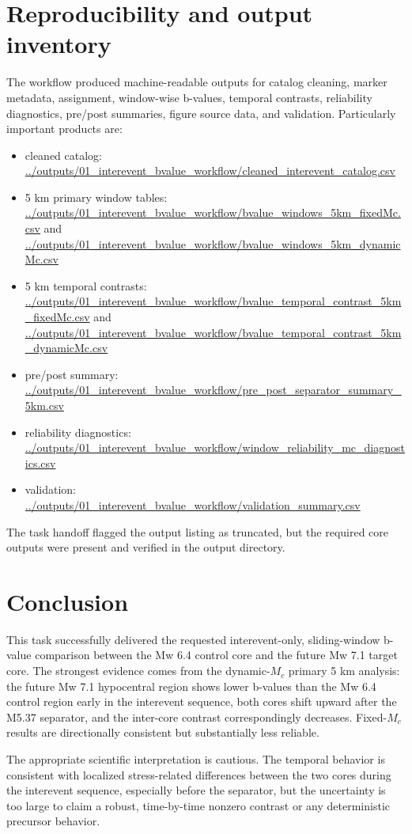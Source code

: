 \documentclass[11pt]{article}
\begin{document}
\section{Reproducibility and output inventory}
The workflow produced machine-readable outputs for catalog cleaning, marker metadata, assignment, window-wise b-values, temporal contrasts, reliability diagnostics, pre/post summaries, figure source data, and validation. Particularly important products are:
\begin{itemize}[leftmargin=1.5em]
    \item cleaned catalog: \url{../outputs/01_interevent_bvalue_workflow/cleaned_interevent_catalog.csv}
    \item 5 km primary window tables: \url{../outputs/01_interevent_bvalue_workflow/bvalue_windows_5km_fixedMc.csv} and \url{../outputs/01_interevent_bvalue_workflow/bvalue_windows_5km_dynamicMc.csv}
    \item 5 km temporal contrasts: \url{../outputs/01_interevent_bvalue_workflow/bvalue_temporal_contrast_5km_fixedMc.csv} and \url{../outputs/01_interevent_bvalue_workflow/bvalue_temporal_contrast_5km_dynamicMc.csv}
    \item pre/post summary: \url{../outputs/01_interevent_bvalue_workflow/pre_post_separator_summary_5km.csv}
    \item reliability diagnostics: \url{../outputs/01_interevent_bvalue_workflow/window_reliability_mc_diagnostics.csv}
    \item validation: \url{../outputs/01_interevent_bvalue_workflow/validation_summary.csv}
\end{itemize}
The task handoff flagged the output listing as truncated, but the required core outputs were present and verified in the output directory.

\section{Conclusion}
This task successfully delivered the requested interevent-only, sliding-window b-value comparison between the Mw 6.4 control core and the future Mw 7.1 target core. The strongest evidence comes from the dynamic-$M_c$ primary 5 km analysis: the future Mw 7.1 hypocentral region shows lower b-values than the Mw 6.4 control region early in the interevent sequence, both cores shift upward after the M5.37 separator, and the inter-core contrast correspondingly decreases. Fixed-$M_c$ results are directionally consistent but substantially less reliable.

The appropriate scientific interpretation is cautious. The temporal behavior is consistent with localized stress-related differences between the two cores during the interevent sequence, especially before the separator, but the uncertainty is too large to claim a robust, time-by-time nonzero contrast or any deterministic precursor behavior.
\end{document}
